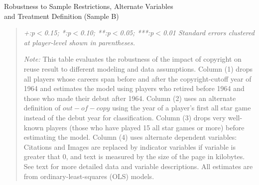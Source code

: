 \begin{center}
\begin{table}[!htbp]

\caption{Robustness to Sample Restrictions, Alternate Variables \\ and Treatment Definition (Sample B)}
\vspace{5mm}
\begin{adjustwidth}{.2cm}{.2cm}

%
\end{adjustwidth}

\begin{quote}
\vspace{5mm}

\emph{+:p$<$0.15; *:p$<$0.10; **:p$<$0.05; ***:p$<$0.01 
\newline
Standard errors clustered at player-level shown in parentheses.}
\vspace{5mm}

\emph{Note:} This table evaluates the robustness of the impact of copyright on reuse result to different modeling and data assumptions. Column (1) drops all players whose careers span before and after the copyright-cutoff year of 1964 and estimates the model using players who retired before 1964 and those who made their debut after 1964. Column (2) uses an alternate definition of $out-of-copy$ using the year of a player's first all star game instead of the debut year for classification. Column (3) drops very well-known players (those who have played 15 all star games or more) before estimating the model. Column (4) uses alternate dependent variables: Citations and Images are replaced by indicator variables if variable is greater that 0, and text is measured by the size of the page in kilobytes. See text for more detailed data and variable descriptions. All estimates are from ordinary-least-squares (OLS) models. 
\end{quote}
\label{tab:app_robust}
\end{table}
\end{center}


\newpage



